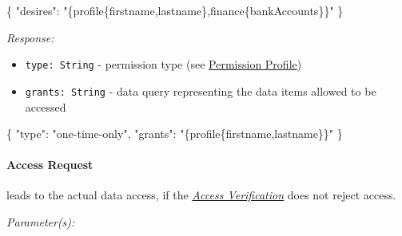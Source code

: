 \documentclass[12pt,english,a4paper,titlepage,cleardoublepage=empty,dottedtoc]{report}
\newenvironment{Shaded}{\begin{snugshade}}{\end{snugshade}}
\newcommand{\DataTypeTok}[1]{\textcolor[rgb]{0.13,0.29,0.53}{#1}}
\newcommand{\StringTok}[1]{\textcolor[rgb]{0.31,0.60,0.02}{#1}}
\newcommand{\FunctionTok}[1]{\textcolor[rgb]{0.00,0.00,0.00}{#1}}
\providecommand{\tightlist}{%
  \setlength{\itemsep}{0pt}\setlength{\parskip}{0pt}}
\begin{document}
\begin{Shaded}
\begin{Highlighting}[numbers=left,,]
\FunctionTok{\{}
    \DataTypeTok{"desires"}\FunctionTok{:} \StringTok{"\{profile\{firstname,lastname\},finance\{bankAccounts\}\}"}
\FunctionTok{\}}
\end{Highlighting}
\end{Shaded}

\emph{Response:}

\begin{itemize}
\tightlist
\item
  \texttt{type:\ String} - permission type (see
  \protect\hyperlink{permission-profile}{Permission Profile})
\item
  \texttt{grants:\ String} - data query representing the data items
  allowed to be accessed
\end{itemize}

\begin{Shaded}
\begin{Highlighting}[numbers=left,,]
\FunctionTok{\{}
    \DataTypeTok{"type"}\FunctionTok{:} \StringTok{"one-time-only"}\FunctionTok{,}
    \DataTypeTok{"grants"}\FunctionTok{:} \StringTok{"\{profile\{firstname,lastname\}\}"}
\FunctionTok{\}}
\end{Highlighting}
\end{Shaded}

\paragraph{Access Request}\label{spec_api_access-request}

leads to the actual data access, if the
\emph{\protect\hyperlink{access-verification}{Access Verification}} does
not reject access.

\emph{Parameter(s):}
\end{document}
